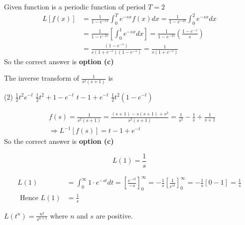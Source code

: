 \begin{answer}
	Given function is a periodic function of period $T=2$
	\begin{align*}
	L[f(x)] &=\frac{1}{1-e^{-s T}} \int_{0}^{T} e^{-s x} f(x) d x=\frac{1}{1-e^{-2 s}} \int_{0}^{2} e^{-s x} d x \\
	&=\frac{1}{1-e^{-2 s}}\left[\int_{0}^{1} e^{-s x} d x\right]=\frac{1}{1-e^{-2 s}}\left(\frac{1-e^{-s}}{s}\right) \\
	&=\frac{\left(1-e^{-s}\right)}{s\left(1+e^{-s}\right)\left(1-e^{-s}\right)}=\frac{1}{s\left(1+e^{-s}\right)}
	\end{align*}
	So the correct answer is \textbf{option (c)}
\end{answer}
\begin{exercise}
	The inverse transform of $\frac{1}{s^2(s+1)}$ is
	\begin{tasks}(2)
		\task[\textbf{a.}]$\frac{1}{2} t^{2} e^{-t}$
		\task[\textbf{b.}]$\frac{1}{2} t^{2}+1-e^{-t}$
		\task[\textbf{c.}]$t-1+e^{-t}$
		\task[\textbf{d.}] $\frac{1}{2} t^{2}\left(1-e^{-t}\right)$ 
	\end{tasks}
\end{exercise}
\begin{answer}
	\begin{align*}
	&f(s)=\frac{1}{s^{2}(s+1)}=\frac{(s+1)-s(s+1)+s^{2}}{s^{2}(s+1)}=\frac{1}{s^{2}}-\frac{1}{s}+\frac{1}{s+1} \\
	&\Rightarrow L^{-1}[f(s)]=t-1+e^{-t}
	\end{align*}
	So the correct answer is \textbf{option (c)}
\end{answer}
\begin{exercise}
	$$
	L(1)=\frac{1}{s}
	$$
\end{exercise}
\begin{answer}
	\begin{align*}
		L(1)&=\int_{0}^{\infty} 1 \cdot e^{-s t} d t=\left[\frac{e^{-s t}}{-s}\right]_{0}^{\infty}=-\frac{1}{s}\left[\frac{1}{e^{s t}}\right]_{0}^{\infty}=-\frac{1}{s}[0-1]=\frac{1}{s}\\
		\text{ Hence }L(1)&=\frac{1}{s}
	\end{align*}
\end{answer}
\begin{exercise}
	$L\left(t^{n}\right)=\frac{n !}{s^{n+1}}$ where $n$ and $s$ are positive.
\end{exercise}
